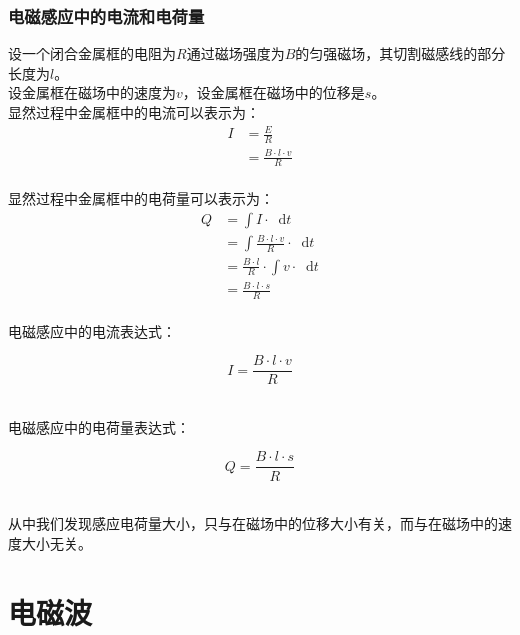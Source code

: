\documentclass[UTF8]{ctexart}
\newcommand*{\dif}{\mathop{}\!\mathrm{d}}
\begin{document}
\newpage

\subsubsection{电磁感应中的电流和电荷量}
    设一个闭合金属框的电阻为$R$通过磁场强度为$B$的匀强磁场，其切割磁感线的部分长度为$l$。\\[3mm]
    设金属框在磁场中的速度为$v$，设金属框在磁场中的位移是$s$。\\[4mm]
    显然过程中金属框中的电流可以表示为：
    \begin{align}
        I
        &=\frac{E}{R}\\[4mm]
        &=\frac{B\cdot l\cdot v}{R}
    \end{align}\\
    显然过程中金属框中的电荷量可以表示为：
    \setcounter{equation}{0}
    \begin{align}
        Q
        &=\int I\cdot\dif t\\[4mm]
        &=\int \frac{B\cdot l\cdot v}{R}\cdot\dif t\\[4mm]
        &=\frac{B\cdot l}{R}\cdot\int v\cdot\dif t\\[4mm]
        &=\frac{B\cdot l\cdot s}{R} 
    \end{align}\\
    电磁感应中的电流表达式：
    \begin{large}
        \begin{equation*}
            I=\frac{B\cdot l\cdot v}{R}
        \end{equation*}
    \end{large}\\
    电磁感应中的电荷量表达式：
    \begin{large}
        \begin{equation*}
            Q=\frac{B\cdot l\cdot s}{R}
        \end{equation*}
    \end{large}\\
    从中我们发现感应电荷量大小，只与在磁场中的位移大小有关，而与在磁场中的速度大小无关。

\newpage

\section{电磁波}
\end{document}
